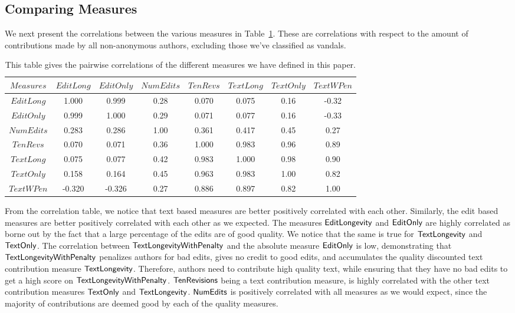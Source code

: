 \pagebreak
\subsection{Comparing Measures}

We next present the correlations between the various measures
in Table~\ref{cor-tab}.
These are correlations with respect to the amount of contributions
made by all non-anonymous authors, excluding those we've classified
as vandals.  
%
\begin{table}[!tp]
\begin{center}
\begin{tabular}{|c||c|c|c|c|c|c|c|}
	\hline
$Measures$ &  $EditLong$ & $EditOnly$ & $NumEdits$ & $TenRevs$ & $TextLong$ & $TextOnly$ & $TextWPen$ \\
        \hline \hline
$EditLong$         &  1.000  & 0.999  &  0.28  &         0.070  & 0.075  &  0.16  & -0.32 \\
$EditOnly$         &  0.999  & 1.000  &  0.29  &         0.071  & 0.077  &  0.16  & -0.33 \\
$NumEdits$         &  0.283  & 0.286  &  1.00  &         0.361  & 0.417  &  0.45  &  0.27 \\
$TenRevs$          &  0.070  & 0.071  &  0.36  &         1.000  & 0.983  &  0.96  &  0.89 \\
$TextLong$         &  0.075  & 0.077  &  0.42  &         0.983  & 1.000  &  0.98  &  0.90 \\
$TextOnly$         &  0.158  & 0.164  &  0.45  &         0.963  & 0.983  &  1.00  &  0.82 \\
$TextWPen$         & -0.320  &-0.326  &  0.27  &         0.886  & 0.897  &  0.82  &  1.00 \\
        \hline
\end{tabular}
\end{center}
\caption[Correlations of our measures]{
This table gives the pairwise correlations of the different measures we 
have defined in this paper.
}\label{cor-tab}
\end{table}
%
From the correlation table, we notice that text based measures are
better positively correlated with each other.
Similarly, the edit based measures are better positively correlated 
with each other as we expected.
The measures $\mathsf{EditLongevity}$ and $\mathsf{EditOnly}$ are highly correlated as 
borne out by the fact that a large percentage of the edits are of
good quality.
We notice that the same is true for $\mathsf{TextLongevity}$ and $\mathsf{TextOnly}$.
The correlation between $\mathsf{TextLongevityWithPenalty}$ and the absolute measure
$\mathsf{EditOnly}$ is low, demonstrating that $\mathsf{TextLongevityWithPenalty}$
penalizes authors for bad edits, gives no credit to good edits,
and accumulates the quality discounted text contribution measure 
$\mathsf{TextLongevity}$.
Therefore, authors need to contribute high quality text, while
ensuring that they have no bad edits to get a high score on
$\mathsf{TextLongevityWithPenalty}$.
$\mathsf{TenRevisions}$ being a text contribution measure, is highly correlated
with the other text contribution measures $\mathsf{TextOnly}$ and
$\mathsf{TextLongevity}$.
$\mathsf{NumEdits}$ is positively correlated with all measures as we would
expect, since the majority of contributions are deemed good by
each of the quality measures.

